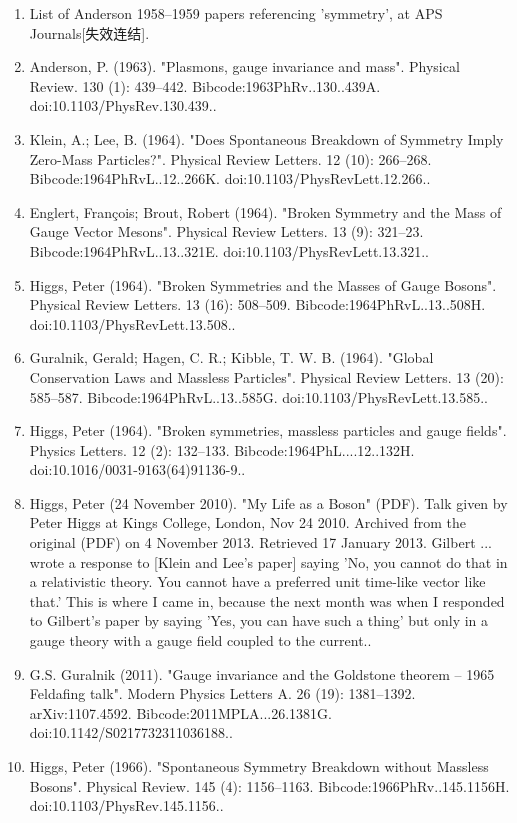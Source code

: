 \begin{enumerate}
    \item List of Anderson 1958–1959 papers referencing 'symmetry', at APS Journals[失效连结].
    \item Anderson, P. (1963). "Plasmons, gauge invariance and mass". Physical Review. 130 (1): 439–442. Bibcode:1963PhRv..130..439A. doi:10.1103/PhysRev.130.439..
    \item Klein, A.; Lee, B. (1964). "Does Spontaneous Breakdown of Symmetry Imply Zero-Mass Particles?". Physical Review Letters. 12 (10): 266–268. Bibcode:1964PhRvL..12..266K. doi:10.1103/PhysRevLett.12.266..
    \item Englert, François; Brout, Robert (1964). "Broken Symmetry and the Mass of Gauge Vector Mesons". Physical Review Letters. 13 (9): 321–23. Bibcode:1964PhRvL..13..321E. doi:10.1103/PhysRevLett.13.321..
    \item Higgs, Peter (1964). "Broken Symmetries and the Masses of Gauge Bosons". Physical Review Letters. 13 (16): 508–509. Bibcode:1964PhRvL..13..508H. doi:10.1103/PhysRevLett.13.508..
    \item Guralnik, Gerald; Hagen, C. R.; Kibble, T. W. B. (1964). "Global Conservation Laws and Massless Particles". Physical Review Letters. 13 (20): 585–587. Bibcode:1964PhRvL..13..585G. doi:10.1103/PhysRevLett.13.585..
    \item Higgs, Peter (1964). "Broken symmetries, massless particles and gauge fields". Physics Letters. 12 (2): 132–133. Bibcode:1964PhL....12..132H. doi:10.1016/0031-9163(64)91136-9..
    \item Higgs, Peter (24 November 2010). "My Life as a Boson" (PDF). Talk given by Peter Higgs at Kings College, London, Nov 24 2010. Archived from the original (PDF) on 4 November 2013. Retrieved 17 January 2013. Gilbert ... wrote a response to [Klein and Lee's paper] saying 'No, you cannot do that in a relativistic theory. You cannot have a preferred unit time-like vector like that.' This is where I came in, because the next month was when I responded to Gilbert’s paper by saying 'Yes, you can have such a thing' but only in a gauge theory with a gauge field coupled to the current..
    \item G.S. Guralnik (2011). "Gauge invariance and the Goldstone theorem – 1965 Feldafing talk". Modern Physics Letters A. 26 (19): 1381–1392. arXiv:1107.4592. Bibcode:2011MPLA...26.1381G. doi:10.1142/S0217732311036188..
    \item Higgs, Peter (1966). "Spontaneous Symmetry Breakdown without Massless Bosons". Physical Review. 145 (4): 1156–1163. Bibcode:1966PhRv..145.1156H. doi:10.1103/PhysRev.145.1156..

\end{enumerate}
